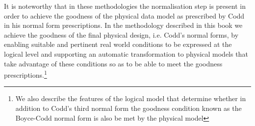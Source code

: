 \mynote It is noteworthy that in these methodologies the normalisation step is present in order to achieve the goodness of the physical data model as prescribed by Codd in his normal form prescriptions. In the methodology described in this book we achieve the goodness of the final physical design, i.e. Codd's normal forms, by enabling suitable and pertinent real world conditions to be expressed at the logical level and supporting an automatic transformation to physical models that take advantage of these conditions so as to be able to meet the goodness prescriptions.\footnote{We also describe the features of the logical model that determine whether in addition to Codd's third normal form the goodness condition known as the Boyce-Codd normal form is also be met by the physical model}

